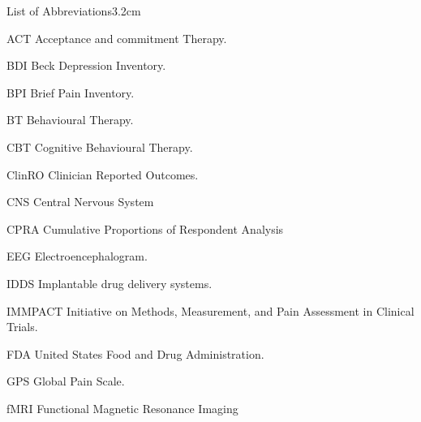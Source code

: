 \begin{mclistof}{List of Abbreviations}{3.2cm}

\item[ACT] Acceptance and commitment Therapy.

\item[BDI] Beck Depression Inventory.

\item[BPI] Brief Pain Inventory.

\item[BT] Behavioural Therapy.

\item[CBT] Cognitive Behavioural Therapy.

\item[ClinRO] Clinician Reported Outcomes.

\item[CNS] Central Nervous System

\item[CPRA] Cumulative Proportions of Respondent Analysis

\item[EEG] Electroencephalogram.

\item[IDDS]Implantable drug delivery systems.

\item[IMMPACT] Initiative on Methods, Measurement, and Pain Assessment in Clinical Trials.

\item[FDA] United States Food and Drug Administration.

\item[GPS] Global Pain Scale.

\item[fMRI] Functional Magnetic Resonance Imaging



\end{mclistof} 
